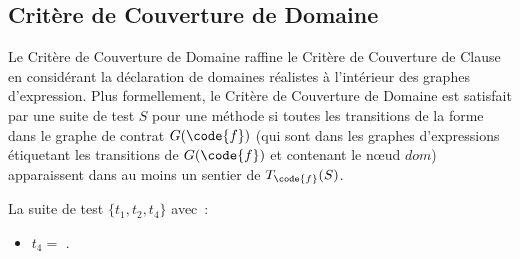 \subsection{Critère de Couverture de Domaine}

Le Critère de Couverture de Domaine raffine le Critère de Couverture de Clause
en considérant la déclaration de domaines réalistes à l'intérieur des graphes
d'expression. Plus formellement, le Critère de Couverture de Domaine est
satisfait par une suite de test $S$ pour une méthode  si toutes les
transitions de la forme  dans le graphe de contrat $G(\code{f})$
(qui sont dans les graphes d'expressions étiquetant les transitions de
$G(\code{f})$ et contenant le nœud $\mathit{dom}$) apparaissent dans au moins un
sentier de $T_\code{f}(S)$.

\begin{example}

La suite de test $\{t_1, t_2, t_4\}$ avec~:
%
\begin{itemize}

\item
$t_4 =$ .


\end{itemize}
\end{example}
